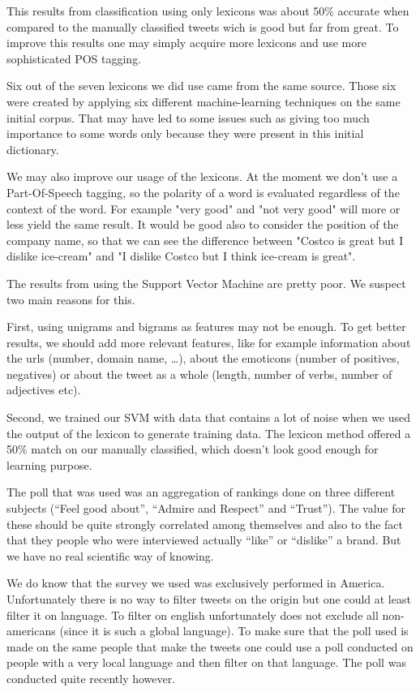\documentclass[a4paper,12pt]{report}
\begin{document}
This results from classification using only lexicons was about 50\% accurate when compared to the manually classified tweets wich is good but far from great. To improve this results one may simply acquire more lexicons and use more sophisticated POS tagging. 

Six out of the seven lexicons we did use came from the same source. Those six were created by applying six different machine-learning techniques on the same initial corpus. That may have led to some issues such as giving too much importance to some words only because they were present in this initial dictionary.

We may also improve our usage of the lexicons. At the moment we don't use a Part-Of-Speech tagging, so the polarity of a word is evaluated regardless of the context of the word. For example "very good" and "not very good" will more or less yield the same result. It would be good also to consider the position of the company name, so that we can see the difference between "Costco is great but I dislike ice-cream" and "I dislike Costco but I think ice-cream is great".

The results from using the Support Vector Machine are pretty poor. We suspect two main reasons for this.

First, using unigrams and bigrams as features may not be enough. To get better results, we should add more relevant features, like for example information about the urls (number, domain name, …), about the emoticons (number of positives, negatives) or about the tweet as a whole (length, number of verbs, number of adjectives etc).

Second, we trained our SVM with data that contains a lot of noise when we used the output of the lexicon to generate training data. The lexicon method offered a 50\% match on our manually classified, which doesn’t look good enough for learning purpose.

The poll that was used was an aggregation of rankings done on three different subjects (“Feel good about”, “Admire and Respect” and “Trust”). The value for these should be quite strongly correlated among themselves and also to the fact that they people who were interviewed actually “like” or “dislike” a brand. But we have no real scientific way of knowing.

We do know that the survey we used was exclusively performed in America. Unfortunately there is no way to filter tweets on the origin but one could at least filter it on language. To filter on english unfortunately does not exclude all non-americans (since it is such a global language). To make sure that the poll used is made on the same people that make the tweets one could use a poll conducted on people with a very local language and then filter on that language. The poll was conducted quite recently however.
\end{document}
